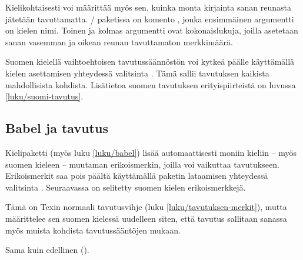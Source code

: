 \begin{koodilohkosis}
\end{koodilohkosis}

\noindent
Kielikohtaisesti voi määrittää myös sen, kuinka monta kirjainta sanan
reunasta jätetään tavuttamatta. \-/ paketissa on
komento , jonka ensimmäinen argumentti on
kielen nimi. Toinen ja kolmas argumentti ovat kokonaislukuja, joilla
asetetaan sanan vasemman ja oikean reunan tavuttamaton merkkimäärä.

\begin{koodilohkosis}
\end{koodilohkosis}

\noindent
Suomen kielellä vaihtoehtoisen tavutussäännöstön voi kytkeä päälle
käyttämällä kielen asettamisen yhteydessä valitsinta
. Tämä sallii tavutuksen kaikista
mahdollisista kohdista. Lisätietoa suomen tavutuksen erityispiirteistä
on luvussa \ref{luku/suomi-tavutus}.

\begin{koodilohkosis}
\setdefaultlanguage[hyphens=school]{finnish}
\end{koodilohkosis}

\subsection{Babel ja tavutus}
\label{luku/tavutus-babel}

Kielipaketti \yipilkku{} (myös
luku \ref{luku/babel}) lisää automaattisesti moniin kieliin -- myös
suomen kieleen -- muutaman erikoismerkin, joilla voi vaikuttaa
tavutukseen. Erikoismerkit saa pois päältä käyttämällä paketin
lataamisen yhteydessä valitsinta .
Seuraavassa on selitetty suomen kielen erikoismerkkejä.

\begin{maaritelma}{}
\item [\komento{-}] Tämä on Texin normaali tavutusvihje (luku
  \ref{luku/tavutuksen-merkit}), mutta  määrittelee sen
  suomen kielessä uudelleen siten, että tavutus sallitaan sanassa myös
  muista kohdista tavutussääntöjen mukaan.

  \shorthandsyhdysmerkki

\item [\textquotedbl=] Sama kuin edellinen (\koodi{\textquotedbl-}).

  \shorthandspystyviiva

  \shorthandslainausmerkki

\end{maaritelma}


